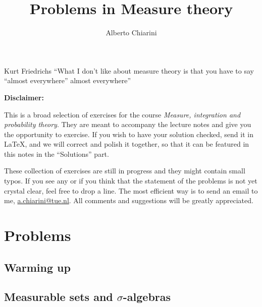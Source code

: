 \documentclass{easyclass}
\begin{document}
\begin{titlepage}
    \title{Problems in Measure theory}
    \author{Alberto Chiarini}
    \maketitle
\end{titlepage}

\begin{chapquote}[30pt]{Kurt Friedrichs}
``What I don't like about measure theory is that you have to say ``almost everywhere'' almost everywhere''
\end{chapquote}
\vfill
\textbf{Disclaimer:}

\vspace{0.5cm}
This is a broad selection of exercises for the course \emph{Measure, integration and probability theory}. They are meant to accompany the lecture notes and give you the opportunity to exercise. If you wish to have your solution checked, send it in \LaTeX, and we will correct and polish it together, so that it can be featured in this notes in the ``Solutions'' part.

These collection of exercises are still in progress and they might contain small typos. If you see any or if you think that the statement of the problems is not yet crystal clear, feel free to drop a line. The most efficient way is to send an email to me, \href{mailto:a.chiarini@tue.nl}{a.chiarini@tue.nl}. All comments and suggestions will be greatly appreciated.

\newpage

\tableofcontents


\part{Problems}

\chapter{Warming up}


\chapter{Measurable sets and \texorpdfstring{$\sigma$}{}-algebras}


\end{document}
